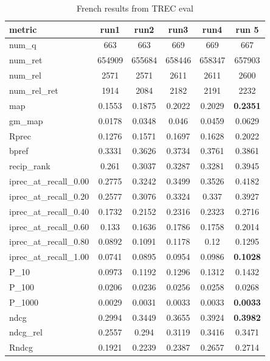 
    \begin{table}[!h]
    \centering
    \begin{tabular}{ |l|c|c|c|c|c| }
        \hline
        metric & run1 & run2  & run3 & run4 &run 5 \\ \hline
        num\_q & 663 & 663 & 669 & 669 & 667 \\ \hline
        num\_ret & 654909 & 655684 & 658446 & 658347 & 657903 \\ \hline
        num\_rel & 2571 & 2571 & 2611 & 2611 & 2600 \\ \hline
        num\_rel\_ret & 1914 & 2084 & 2182 & 2191 & 2232 \\ \hline
        map & 0.1553 & 0.1875 & 0.2022 & 0.2029 & \textbf{0.2351} \\ \hline
        gm\_map & 0.0178 & 0.0348 & 0.046 & 0.0459 & 0.0629 \\ \hline
        Rprec & 0.1276 & 0.1571 & 0.1697 & 0.1628 & 0.2022 \\ \hline
        bpref & 0.3331 & 0.3626 & 0.3734 & 0.3761 & 0.3861 \\ \hline
        recip\_rank & 0.261 & 0.3037 & 0.3287 & 0.3281 & 0.3945 \\ \hline
        iprec\_at\_recall\_0.00 & 0.2775 & 0.3242 & 0.3499 & 0.3526 & 0.4182 \\ \hline
        iprec\_at\_recall\_0.20 & 0.2577 & 0.3076 & 0.3324 & 0.337 & 0.3927 \\ \hline
        iprec\_at\_recall\_0.40 & 0.1732 & 0.2152 & 0.2316 & 0.2323 & 0.2716 \\ \hline
        iprec\_at\_recall\_0.60 & 0.133 & 0.1636 & 0.1786 & 0.1758 & 0.2014 \\ \hline
        iprec\_at\_recall\_0.80 & 0.0892 & 0.1091 & 0.1178 & 0.12 & 0.1295 \\ \hline
        iprec\_at\_recall\_1.00 & 0.0741 & 0.0895 & 0.0954 & 0.0986 & \textbf{0.1028} \\ \hline
        P\_10 & 0.0973 & 0.1192 & 0.1296 & 0.1312 & 0.1432 \\ \hline
        P\_100 & 0.0206 & 0.0236 & 0.0256 & 0.0258 & 0.0268 \\ \hline
        P\_1000 & 0.0029 & 0.0031 & 0.0033 & 0.0033 & \textbf{0.0033} \\ \hline
        ndcg & 0.2994 & 0.3449 & 0.3655 & 0.3924 & \textbf{0.3982} \\ \hline
        ndcg\_rel & 0.2557 & 0.294 & 0.3119 & 0.3416 & 0.3471 \\ \hline
        Rndcg & 0.1921 & 0.2239 & 0.2387 & 0.2657 & 0.2714 \\ \hline
    \end{tabular}
    \label{table:french_r}
    \caption{French results from \ac{TREC} eval}
\end{table}


